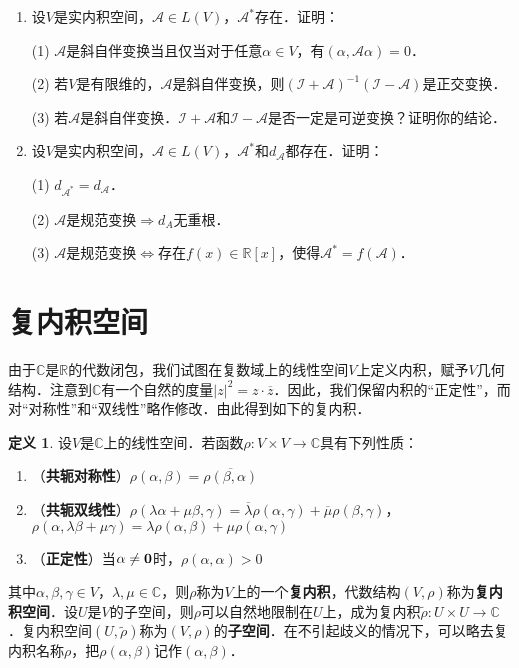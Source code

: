 \documentclass[a4paper,fontset=windows]{ctexbook}
\theoremstyle{definition}
\newtheorem{definition}{定义}[chapter]
\begin{document}
\begin{enumerate}
(3) 若$\mathcal{A}^*$可逆，则$(\mathcal{A}^{-1})^*$存在，并且$(\mathcal{A}^{-1})^*=(\mathcal{A}^*)^{-1}$．

\item 设$V$是实内积空间，$\mathcal{A}\in L(V)$，$\mathcal{A}^*$存在．证明：

(1) $\mathcal{A}$是斜自伴变换当且仅当对于任意$\alpha\in V$，有$(\alpha,\mathcal{A}\alpha)=0$．

(2) 若$V$是有限维的，$\mathcal{A}$是斜自伴变换，则$(\mathcal{I+A})^{-1}(\mathcal{I-A})$是正交变换．

(3) 若$\mathcal{A}$是斜自伴变换．$\mathcal{I+A}$和$\mathcal{I-A}$是否一定是可逆变换？证明你的结论．

\item 设$V$是实内积空间，$\mathcal{A}\in L(V)$，$\mathcal{A}^*$和$d_{\mathcal{A}}$都存在．证明：

(1) $d_{\mathcal{A}^*}=d_{\mathcal{A}}$．

(2) $\mathcal{A}$是规范变换$\Rightarrow d_A$无重根．

(3) $\mathcal{A}$是规范变换$\Leftrightarrow$存在$f(x)\in\mathbb{R}[x]$，使得$\mathcal{A}^*=f(\mathcal{A})$．

\end{enumerate}

\clearpage\section{复内积空间}

由于$\mathbb{C}$是$\mathbb{R}$的代数闭包，我们试图在复数域上的线性空间$V$上定义内积，赋予$V$几何结构．注意到$\mathbb{C}$有一个自然的度量$|z|^2=z\cdot\overline{z}$．因此，我们保留内积的“正定性”，而对“对称性”和“双线性”略作修改．由此得到如下的复内积．

\begin{definition}
设$V$是$\mathbb{C}$上的线性空间．若函数$\rho:V\times V\to\mathbb{C}$具有下列性质：
\begin{enumerate}
\item（{\bf 共轭对称性}）$\rho(\alpha,\beta)=\overline{\rho(\beta,\alpha)}$

\item（{\bf 共轭双线性}）$\rho(\lambda\alpha+\mu\beta,\gamma)=\overline{\lambda}\rho(\alpha,\gamma)+\overline{\mu}\rho(\beta,\gamma)$，$\rho(\alpha,\lambda\beta+\mu\gamma)=\lambda\rho(\alpha,\beta)+\mu\rho(\alpha,\gamma)$

\item（{\bf 正定性}）当$\alpha\ne{\bf 0}$时，$\rho(\alpha,\alpha)>0$
\end{enumerate}
其中$\alpha,\beta,\gamma\in V$，$\lambda,\mu\in\mathbb{C}$，则$\rho$称为$V$上的一个{\bf 复内积}，代数结构$(V,\rho)$称为{\bf 复内积空间}．设$U$是$V$的子空间，则$\rho$可以自然地限制在$U$上，成为复内积$\tilde{\rho}:U\times U\to\mathbb{C}$．复内积空间$(U,\tilde{\rho})$称为$(V,\rho)$的{\bf 子空间}．在不引起歧义的情况下，可以略去复内积名称$\rho$，把$\rho(\alpha,\beta)$记作$(\alpha,\beta)$．
\end{definition}
\end{document}
